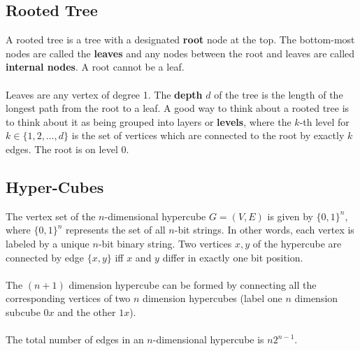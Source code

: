 \documentclass{article}
\theoremstyle{definition}
\begin{document}
\subsection*{Rooted Tree}
A rooted tree is a tree with a designated \textbf{root} node at the top. The bottom-most nodes are called the \textbf{leaves} and any nodes between the root and leaves are called \textbf{internal nodes}. A root cannot be a leaf. \\ \\
Leaves are any vertex of degree 1. The \textbf{depth} $d$ of the tree is the length of the longest path from the root to a leaf. A good way to think about a rooted tree is to think about it as being grouped into layers or \textbf{levels}, where the $k$-th level for $k \in \{1, 2, \dots, d\}$ is the set of vertices which are connected to the root by exactly $k$ edges. The root is on level 0.
\subsection*{Hyper-Cubes}
The vertex set of the $n$-dimensional hypercube $G = (V, E)$ is given by $\{0, 1\}^n$, where $\{0, 1\}^n$ represents the set of all $n$-bit strings. In other words, each vertex is labeled by a unique $n$-bit binary string. Two vertices $x, y$ of the hypercube are connected by edge $\{x, y\}$ iff $x$ and $y$ differ in exactly one bit position. \\ \\
The $(n+1)$ dimension hypercube can be formed by connecting all the corresponding vertices of two $n$ dimension hypercubes (label one $n$ dimension subcube $0x$ and the other $1x$). \\ \\
The total number of edges in an $n$-dimensional hypercube is $n2^{n - 1}$.
\end{document}
